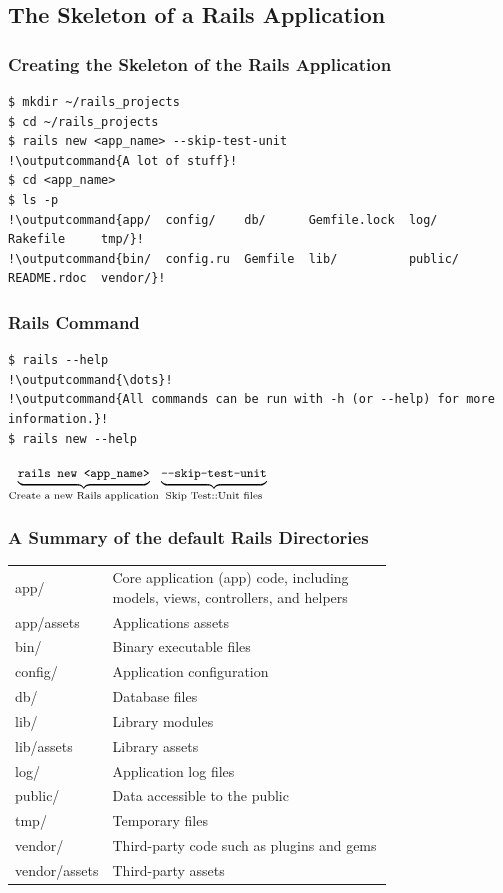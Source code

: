 \documentclass{beamer}
\newcommand{\commandinline}[1]{\lstinline[basicstyle=\small\lstfontfamily]{#1}}
\newcommand{\outputcommand}[1]{\color{darkgreen}{#1}}
\begin{document}
\subsection{The Skeleton of a Rails Application}
\begin{frame}[fragile]
\frametitle{Creating the Skeleton of the Rails Application}
\lstset{language=shell}
\begin{lstlisting}[escapechar=!]
$ mkdir ~/rails_projects
$ cd ~/rails_projects
$ rails new <app_name> --skip-test-unit
!\outputcommand{A lot of stuff}!
$ cd <app_name>
$ ls -p
!\outputcommand{app/  config/    db/      Gemfile.lock  log/     Rakefile     tmp/}!
!\outputcommand{bin/  config.ru  Gemfile  lib/          public/  README.rdoc  vendor/}!
\end{lstlisting}
\end{frame}
\begin{frame}[fragile]
\frametitle{Rails Command}
\lstset{language=shell}
\begin{lstlisting}[escapechar=!]
$ rails --help
!\outputcommand{\dots}!
!\outputcommand{All commands can be run with -h (or --help) for more information.}!
$ rails new --help
\end{lstlisting}
$\underbrace{\text{\commandinline{rails new <app_name>}}}_{\text{Create a new Rails application}}\underbrace{\text{\commandinline{ --skip-test-unit}}}_{\text{Skip Test::Unit files}}$
\end{frame}
\begin{frame}
\frametitle{A Summary of the default Rails Directories}
\begin{tabular}{lp{0.75 \linewidth}}
app/ & Core application (app) code, including models, views, controllers, and helpers \\
app/assets &	Applications assets \\
bin/ & Binary executable files \\
config/	& Application configuration \\
db/ & Database files \\
lib/ & Library modules\\
lib/assets & Library assets\\
log/ & Application log files \\
public/	& Data accessible to the public\\
tmp/ & Temporary files \\
vendor/	& Third-party code such as plugins and gems \\
vendor/assets & Third-party assets\\
\end{tabular}
\end{frame}
\end{document}
